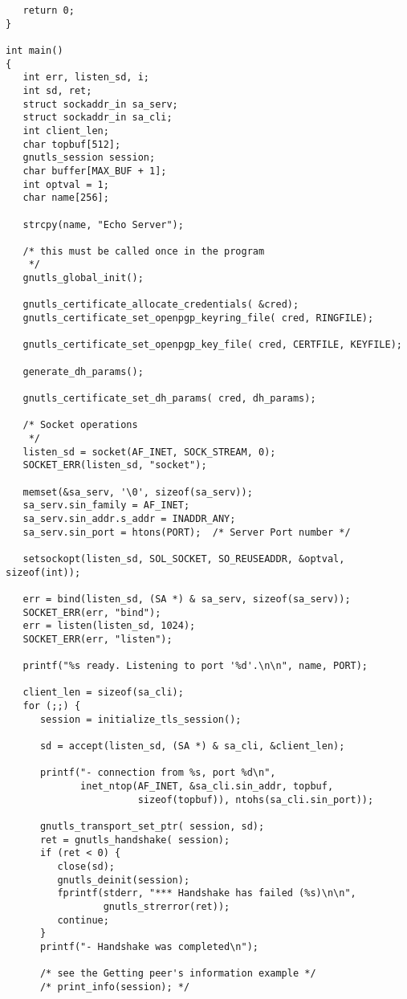 \begin{verbatim}
   return 0;
}

int main()
{
   int err, listen_sd, i;
   int sd, ret;
   struct sockaddr_in sa_serv;
   struct sockaddr_in sa_cli;
   int client_len;
   char topbuf[512];
   gnutls_session session;
   char buffer[MAX_BUF + 1];
   int optval = 1;
   char name[256];

   strcpy(name, "Echo Server");

   /* this must be called once in the program
    */
   gnutls_global_init();

   gnutls_certificate_allocate_credentials( &cred);
   gnutls_certificate_set_openpgp_keyring_file( cred, RINGFILE);

   gnutls_certificate_set_openpgp_key_file( cred, CERTFILE, KEYFILE);

   generate_dh_params();
   
   gnutls_certificate_set_dh_params( cred, dh_params);

   /* Socket operations
    */
   listen_sd = socket(AF_INET, SOCK_STREAM, 0);
   SOCKET_ERR(listen_sd, "socket");

   memset(&sa_serv, '\0', sizeof(sa_serv));
   sa_serv.sin_family = AF_INET;
   sa_serv.sin_addr.s_addr = INADDR_ANY;
   sa_serv.sin_port = htons(PORT);  /* Server Port number */

   setsockopt(listen_sd, SOL_SOCKET, SO_REUSEADDR, &optval, sizeof(int));

   err = bind(listen_sd, (SA *) & sa_serv, sizeof(sa_serv));
   SOCKET_ERR(err, "bind");
   err = listen(listen_sd, 1024);
   SOCKET_ERR(err, "listen");

   printf("%s ready. Listening to port '%d'.\n\n", name, PORT);

   client_len = sizeof(sa_cli);
   for (;;) {
      session = initialize_tls_session();

      sd = accept(listen_sd, (SA *) & sa_cli, &client_len);

      printf("- connection from %s, port %d\n",
             inet_ntop(AF_INET, &sa_cli.sin_addr, topbuf,
                       sizeof(topbuf)), ntohs(sa_cli.sin_port));

      gnutls_transport_set_ptr( session, sd);
      ret = gnutls_handshake( session);
      if (ret < 0) {
         close(sd);
         gnutls_deinit(session);
         fprintf(stderr, "*** Handshake has failed (%s)\n\n",
                 gnutls_strerror(ret));
         continue;
      }
      printf("- Handshake was completed\n");

      /* see the Getting peer's information example */
      /* print_info(session); */


\end{verbatim}
